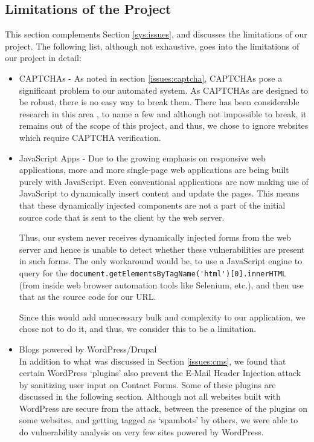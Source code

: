 \subsection[Limitations]{Limitations of the Project}
\label{limitations}
	This section complements Section \ref{sys:issues}, and discusses the limitations of our project. The following list, although not exhaustive, goes into the limitations of our project in detail: 
	\begin{itemize}
		\item CAPTCHAs - As noted in section \ref*{issues:captcha}, CAPTCHAs pose a significant problem to our automated system. As CAPTCHAs are designed to be robust, there is no easy way to break them. There has been considerable research in this area \cite{captchas2}, \cite{captchas} to name a few and although not impossible to break, it remains out of the scope of this project, and thus, we chose to ignore websites which require CAPTCHA verification.
		\item JavaScript Apps - Due to the growing emphasis on responsive web applications, more and more single-page web applications are being built purely with JavaScript. Even conventional applications are now making use of JavaScript to dynamically insert content and update the pages. This means that these dynamically injected components are not a part of the initial source code that is sent to the client by the web server.
		
		Thus, our system never receives dynamically injected forms from the web server and hence is unable to detect whether these vulnerabilities are present in such forms. The only workaround would be, to use a JavaScript engine to query for the \lstinline|document.getElementsByTagName('html')[0].innerHTML| (from inside web browser automation tools like Selenium, etc.), and then use that as the source code for our URL.
		
		Since this would add unnecessary bulk and complexity to our application, we chose not to do it, and thus, we consider this to be a limitation.
		
		\item Blogs powered by WordPress/Drupal\\
        In addition to what was discussed in Section \ref{issues:cms}, we found that certain WordPress `plugins' also prevent the E-Mail Header Injection attack by sanitizing user input on Contact Forms. Some of these plugins are discussed in the following section. Although not all websites built with WordPress are secure from the attack, between the presence of the plugins on some websites, and getting tagged as `spambots' by others, we were able to do vulnerability analysis on very few sites powered by WordPress.
		

\end{itemize}
